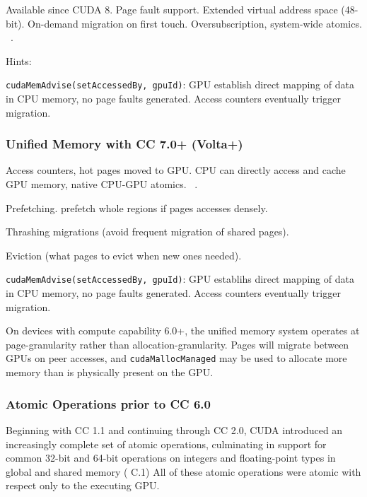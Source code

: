 Available since CUDA 8.
Page fault support.
Extended virtual address space (48-bit).
On-demand migration on first touch.
Oversubscription, system-wide atomics.
~\cite{sakharnykh2017unified}.

Hints:

\texttt{cudaMemAdvise(setAccessedBy, gpuId)}: GPU establish direct mapping of data in CPU memory, no page faults generated.
Access counters eventually trigger migration.

\subsubsection {Unified Memory with CC 7.0+ (Volta+) }

Access counters, hot pages moved to GPU.
CPU can directly access and cache GPU memory, native CPU-GPU atomics.
~\cite{sakharnykh2017unified}.

Prefetching.
prefetch whole regions if pages accesses densely.

Thrashing migrations (avoid frequent migration of shared pages).

Eviction (what pages to evict when new ones needed).

\texttt{cudaMemAdvise(setAccessedBy, gpuId)}: GPU establihs direct mapping of data in CPU memory, no page faults generated.
Access counters eventually trigger migration.





On devices with compute capability 6.0+, the unified memory system operates at page-granularity rather than allocation-granularity.
Pages will migrate between GPUs on peer accesses, and \texttt{cudaMallocManaged} may be used to allocate more memory than is physically present on the GPU.


\subsubsection{Atomic Operations prior to CC 6.0}

Beginning with CC 1.1 and continuing through CC 2.0, CUDA introduced an increasingly complete set of atomic operations, culminating in support for common 32-bit and 64-bit operations on integers and floating-point types in global and shared memory (\cite{nvidia2008cuda20} C.1)
All of these atomic operations were atomic with respect only to the executing GPU.

